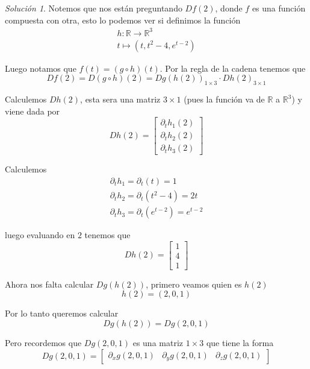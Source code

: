 \documentclass[a4paper,oneside,10.5pt]{article}
\newcommand\RR{\mathbb{R}}
\theoremstyle{definition}
\theoremstyle{plain}
\theoremstyle{remark}
\theoremstyle{theorem}
\newtheorem{sol}{Solución}
\begin{document}
\begin{sol}
Notemos que nos están preguntando $Df(2)$, donde $f$ es una función compuesta con otra, esto lo podemos ver si definimos la función
\begin{gather*}
    h : \RR \to \RR^3\\
    t \mapsto (t, t^2 - 4, e^{t - 2})
\end{gather*}

Luego notamos que $f(t) = (g \circ h)(t)$. Por la regla de la cadena tenemos que
\begin{equation*}
    Df(2) = D(g \circ h)(2) = Dg(h(2))_{1 \times 3} \cdot Dh(2)_{3 \times 1}
\end{equation*}

Calculemos $Dh(2)$, esta sera una matriz $3 \times 1$ (pues la función va de $\RR$ a $\RR^3$) y viene dada por
\begin{equation*}
    Dh(2) = \begin{bmatrix}
        \partial_t h_1(2)\\ \partial_t h_2(2)\\ \partial_t h_3(2)
    \end{bmatrix}
\end{equation*}

Calculemos
\begin{gather*}
    \partial_t h_1 = \partial_t (t) = 1\\
    \partial_t h_2 = \partial_t (t^2 - 4) = 2t\\
    \partial_t h_3 = \partial_t (e^{t - 2}) = e^{t - 2}
\end{gather*}

luego evaluando en $2$ tenemos que
\begin{equation*}
    Dh(2) = \begin{bmatrix}
        1\\ 4\\ 1
    \end{bmatrix}
\end{equation*}

Ahora nos falta calcular $Dg(h(2))$, primero veamos quien es $h(2)$
\begin{equation*}
    h(2) = (2, 0, 1)
\end{equation*}

Por lo tanto queremos calcular
\begin{equation*}
    Dg(h(2)) = Dg(2, 0, 1)
\end{equation*}

Pero recordemos que $Dg(2, 0, 1)$ es una matriz $1 \times 3$ que tiene la forma
\begin{equation*}
    Dg(2, 0, 1) = \begin{bmatrix}
        \partial_x g (2, 0, 1)& \partial_y g(2, 0, 1) & \partial_z g(2, 0, 1)
    \end{bmatrix}
\end{equation*}


\end{sol}
\end{document}

